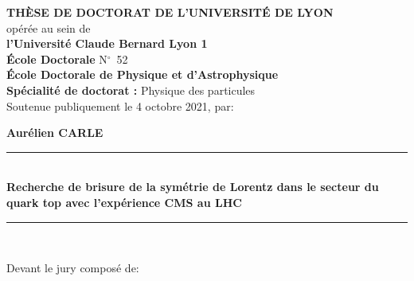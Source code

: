 {\large\textbf{THÈSE DE DOCTORAT DE L'UNIVERSITÉ DE LYON}}\\
{\normalsize opérée au sein de}\\
\textbf{l'Université Claude Bernard Lyon 1}\\
\vspace{\baselineskip}
\textbf{École Doctorale} N$^\circ$\ 52\\
\textbf{École Doctorale de Physique et d'Astrophysique}\\
\vspace{\baselineskip}
\textbf{Spécialité de doctorat :} Physique des particules\\
\vspace{\baselineskip}
Soutenue publiquement le 4 octobre 2021, par:


{\Large\textbf{Aurélien CARLE}}\\
\vspace{\baselineskip}
\rule{\linewidth}{.5pt}\\
\vspace{\baselineskip}
{\LARGE\textbf{Recherche de brisure de la symétrie de Lorentz dans le secteur du quark top avec l’expérience CMS au LHC}}
\vspace{.5\baselineskip}

\rule{\linewidth}{.5pt}\\
\vspace{\baselineskip}
\begin{flushleft}
    Devant le jury composé de:
\end{flushleft}
\vspace{-0.5\baselineskip}
